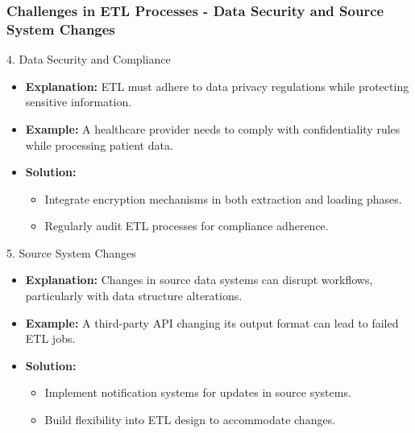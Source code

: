 \documentclass[aspectratio=169]{beamer}
\begin{document}
\begin{frame}[fragile]
    \frametitle{Challenges in ETL Processes - Data Security and Source System Changes}
    \begin{block}{4. Data Security and Compliance}
        \begin{itemize}
            \item \textbf{Explanation:} ETL must adhere to data privacy regulations while protecting sensitive information.
            \item \textbf{Example:} A healthcare provider needs to comply with confidentiality rules while processing patient data.
            \item \textbf{Solution:}
            \begin{itemize}
                \item Integrate encryption mechanisms in both extraction and loading phases.
                \item Regularly audit ETL processes for compliance adherence.
            \end{itemize}
        \end{itemize}
    \end{block}

    \begin{block}{5. Source System Changes}
        \begin{itemize}
            \item \textbf{Explanation:} Changes in source data systems can disrupt workflows, particularly with data structure alterations.
            \item \textbf{Example:} A third-party API changing its output format can lead to failed ETL jobs.
            \item \textbf{Solution:}
            \begin{itemize}
                \item Implement notification systems for updates in source systems.
                \item Build flexibility into ETL design to accommodate changes.
            \end{itemize}
        \end{itemize}
    \end{block}
\end{frame}
\end{document}
